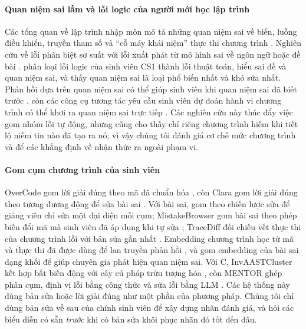 \documentclass[a4paper,preprint,12pt,authoryear]{elsarticle}
\begin{document}
\paragraph{Quan niệm sai lầm và lỗi logic của người mới học lập trình}
Các tổng quan về lập trình nhập môn mô tả những quan niệm sai về biến, luồng điều khiển, truyền tham số và ``cỗ máy khái niệm'' thực thi chương trình \citep{sorva2013notional,qian2017misconceptions}. Nghiên cứu về lỗi phân biệt sơ suất với lỗi xuất phát từ mô hình sai về ngôn ngữ hoặc đề bài \citep{altadmri2015compilations,hermans2021brain}. \citet{ettles2018logic} phân loại lỗi logic của sinh viên CS1 thành lỗi thuật toán, hiểu sai đề và quan niệm sai, và thấy quan niệm sai là loại phổ biến nhất và khó sửa nhất. Phản hồi dựa trên quan niệm sai có thể giúp sinh viên khi quan niệm sai đã biết trước \citep{gusukuma2018misconception}, còn các công cụ tương tác yêu cầu sinh viên dự đoán hành vi chương trình có thể khơi ra quan niệm sai trực tiếp \citep{lu2024smol}. Các nghiên cứu này thúc đẩy việc gom nhóm lỗi tự động, nhưng cũng cho thấy chỉ riêng chương trình hiếm khi tiết lộ niềm tin nào đã tạo ra nó; vì vậy chúng tôi đánh giá cơ chế mức chương trình và để các khẳng định về nhận thức ra ngoài phạm vi.

\paragraph{Gom cụm chương trình của sinh viên}
OverCode gom lời giải đúng theo mã đã chuẩn hóa \citep{glassman2015overcode}, còn Clara gom lời giải đúng theo tương đương động để sửa bài sai \citep{gulwani2018clara}. Với bài sai, \citet{kaleeswaran2016semisupervised} gom theo chiến lược sửa để giảng viên chỉ sửa một đại diện mỗi cụm; MistakeBrowser gom bài sai theo phép biến đổi mã mà sinh viên đã áp dụng khi tự sửa \citep{head2017mistakebrowser}; TraceDiff đối chiếu vết thực thi của chương trình lỗi với bản sửa gần nhất \citep{suzuki2017tracediff}. Embedding chương trình học từ mã và thực thi đã được dùng để lan truyền phản hồi \citep{piech2015embeddings}, và \citet{shi2021misconception} gom embedding của bài sai dạng khối để giúp chuyên gia phát hiện quan niệm sai. Với C, InvAASTCluster kết hợp bất biến động với cây cú pháp trừu tượng hóa \citep{orvalho2025invaast}, còn MENTOR ghép phân cụm, định vị lỗi bằng công thức và sửa lỗi bằng LLM \citep{orvalho2026mentor}. Các hệ thống này dùng bản sửa hoặc lời giải đúng như một phần của phương pháp. Chúng tôi chỉ dùng bản sửa về sau của chính sinh viên để xây dựng nhãn đánh giá, và hỏi các biểu diễn có sẵn \emph{trước} khi có bản sửa khôi phục nhãn đó tốt đến đâu.
\end{document}
